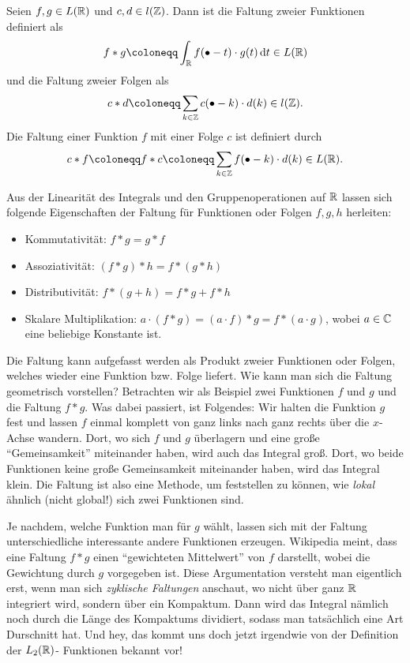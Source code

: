 \begin{definition}[Faltung]
Seien $ f, g \in L(\mathbb{R}) $ und $ c,d \in l(\mathbb{Z}) $. Dann ist die Faltung zweier Funktionen definiert als
\[
  f * g \coloneqq \int_{\R} f(\bullet - t) \cdot g(t) \dif t \in L(\R)
\]
und die Faltung zweier Folgen als
\[
  c * d \coloneqq \sum_{k \in \Z} c(\bullet - k) \cdot d(k) \in l(\Z).
\]
Die Faltung einer Funktion $ f $ mit einer Folge $ c $ ist definiert durch
\[
  c * f \coloneqq f * c \coloneqq \sum_{k \in \Z} f(\bullet - k) \cdot d(k) \in L(\R).
\]
\end{definition}

\begin{remark}
Aus der Linearität des Integrals und den Gruppenoperationen auf $ \mathbb{R} $ lassen sich folgende 
Eigenschaften der Faltung für Funktionen oder Folgen $ f, g, h $ herleiten:
\begin{itemize}
\item Kommutativität: $ f * g = g * f $
\item Assoziativität: $ (f * g) * h = f * (g * h) $
\item Distributivität: $ f * (g + h) = f * g + f * h $
\item Skalare Multiplikation: $ a \cdot (f * g) = (a \cdot f) * g = f * (a \cdot g) $, wobei
  $ a \in \mathbb{C} $ eine beliebige Konstante ist.
\end{itemize}
\end{remark}
\begin{remark}
Die Faltung kann aufgefasst werden als Produkt zweier Funktionen oder Folgen, welches wieder eine
Funktion bzw. Folge liefert. Wie kann man sich die Faltung geometrisch vorstellen? Betrachten wir 
als Beispiel zwei Funktionen $ f $ und $ g $ und die Faltung $ f * g $. Was dabei passiert, ist 
Folgendes: Wir halten die Funktion $ g $ fest und lassen $ f $ einmal komplett von ganz links nach 
ganz rechts über die $ x $-Achse wandern. Dort, wo sich $ f $ und $ g $ überlagern und eine große 
\enquote{Gemeinsamkeit} miteinander haben, wird auch das Integral groß. Dort, wo beide Funktionen 
keine große Gemeinsamkeit miteinander haben, wird das Integral klein. Die Faltung ist also eine 
Methode, um feststellen zu können, wie \emph{lokal} ähnlich (nicht global!) sich zwei Funktionen 
sind.

Je nachdem, welche Funktion man für $ g $ wählt, lassen sich mit der Faltung unterschiedliche 
interessante andere Funktionen erzeugen. Wikipedia meint, dass eine Faltung $ f * g $ einen
\enquote{gewichteten Mittelwert} von $ f $ darstellt, wobei die Gewichtung durch $ g $ vorgegeben 
ist. Diese Argumentation versteht man eigentlich erst, wenn man sich \emph{zyklische Faltungen}
anschaut, wo nicht über ganz $ \mathbb{R} $ integriert wird, sondern über ein Kompaktum. Dann wird das
Integral nämlich noch durch die Länge des Kompaktums dividiert, sodass man tatsächlich eine Art
Durschnitt hat. Und hey, das kommt uns doch jetzt irgendwie von der Definition der $ L_{2}(\mathbb{R}) $-
Funktionen bekannt vor!
\end{remark}

